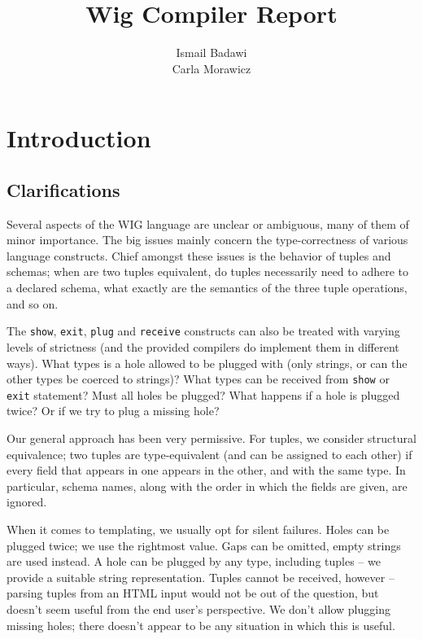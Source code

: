 \documentclass{WigReport}
\title{Wig Compiler Report}
\author{Ismail Badawi \\  %
        Carla Morawicz}
\begin{document}
\MakeTitlePage
\tableofcontents
\clearpage

%
\section{Introduction}
\subsection{Clarifications}
Several aspects of the WIG language are unclear or ambiguous, many of them
of minor importance. The big issues mainly concern the type-correctness of
various language constructs. Chief amongst these issues is the behavior of
tuples and schemas; when are two tuples equivalent, do tuples necessarily
need to adhere to a declared schema, what exactly are the semantics of the 
three tuple operations, and so on. 

The {\tt show}, {\tt exit}, {\tt plug} and {\tt receive} constructs can 
also be treated with varying levels of strictness (and the provided
compilers do implement them in different ways). What types is a hole 
allowed to be plugged with (only strings, or can the other types be coerced
to strings)? What types can be received from {\tt show} or {\tt exit} 
statement? Must all holes be plugged? What happens if a hole is plugged
twice? Or if we try to plug a missing hole?

Our general approach has been very permissive. For tuples, we consider
structural equivalence; two tuples are type-equivalent (and can be assigned
to each other) if every field that appears in one appears in the other, and
with the same type. In particular, schema names, along with the order in
which the fields are given, are ignored.

When it comes to templating, we usually opt for silent failures. Holes can
be plugged twice; we use the rightmost value. Gaps can be omitted, empty
strings are used instead. A hole can be plugged by any type, including
tuples -- we provide a suitable string representation. Tuples cannot be
received, however -- parsing tuples from an HTML input would not be out of
the question, but doesn't seem useful from the end user's perspective.
We don't allow plugging missing holes; there doesn't appear to be any 
situation in which this is useful.
\end{document}
